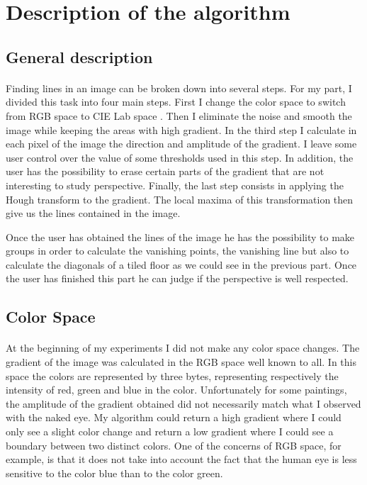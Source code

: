 \documentclass[11pt]{article}
\begin{document}
	\section{Description of the algorithm}
	

	\subsection{General description}
	\label{s:general}
	
	\paragraph{}
	Finding lines in an image can be broken down into several steps. For my part, I divided this task into four main steps. First I change the color space to switch from RGB space to CIE Lab space \cite{cielab}. Then I eliminate the noise and smooth the image while keeping the areas with high gradient. In the third step I calculate in each pixel of the image the direction and amplitude of the gradient. I leave some user control over the value of some thresholds used in this step. In addition, the user has the possibility to erase certain parts of the gradient that are not interesting to study perspective. Finally, the last step consists in applying the Hough transform to the gradient. The local maxima of this transformation then give us the lines contained in the image.
	
	Once the user has obtained the lines of the image he has the possibility to make groups in order to calculate the vanishing points, the vanishing line but also to calculate the diagonals of a tiled floor as we could see in the previous part. Once the user has finished this part he can judge if the perspective is well respected.
	
	\subsection{Color Space}
	
	\paragraph{}
	At the beginning of my experiments I did not make any color space changes. The gradient of the image was calculated in the RGB space well known to all. In this space the colors are represented by three bytes, representing respectively the intensity of red, green and blue in the color. Unfortunately for some paintings, the amplitude of the gradient obtained did not necessarily match what I observed with the naked eye. My algorithm could return a high gradient where I could only see a slight color change and return a low gradient where I could see a boundary between two distinct colors. One of the concerns of RGB space, for example, is that it does not take into account the fact that the human eye is less sensitive to the color blue than to the color green.
	
\end{document}
